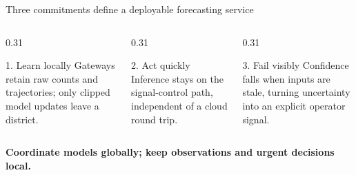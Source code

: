 \begin{frame}{Three commitments define a deployable forecasting service}
  \begin{columns}[T,onlytextwidth]
    \begin{column}{0.31\textwidth}
      \begin{block}{1. Learn locally}
        Gateways retain raw counts and trajectories; only clipped model updates leave a district.
      \end{block}
    \end{column}
    \begin{column}{0.31\textwidth}
      \begin{block}{2. Act quickly}
        Inference stays on the signal-control path, independent of a cloud round trip.
      \end{block}
    \end{column}
    \begin{column}{0.31\textwidth}
      \begin{block}{3. Fail visibly}
        Confidence falls when inputs are stale, turning uncertainty into an explicit operator signal.
      \end{block}
    \end{column}
  \end{columns}

  \vfill
  \centering
  \color{PulseNavy}\large\bfseries
  Coordinate models globally; keep observations and urgent decisions local.
\end{frame}
